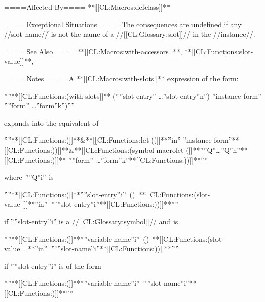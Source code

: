 ====Affected By====
**[[CL:Macros:defclass]]**

====Exceptional Situations====
The consequences are undefined if any //slot-name// is not the name of a //[[CL:Glossary:slot]]// in the //instance//.

====See Also====
**[[CL:Macros:with-accessors]]**, **[[CL:Functions:slot-value]]**, 

====Notes====
A **[[CL:Macros:with-slots]]** expression of the form:

''''\jot\vbox{\settabs\+\cr \+**[[CL:Functions:(with-slots]]** (''{''slot-entry''} \ldots{''slot-entry''}\sub n'') ''instance-form'' ''{''form''} \ldots{''form''}\sub k'')\cr}''''

\noindent expands into the equivalent of

''''\jot\vbox{\settabs\+\cr \+**[[CL:Functions:(]]**&**[[CL:Functions:let ((]]**''in'' ''instance-form''**[[CL:Functions:))]]**\cr \+&**[[CL:Functions:(symbol-macrolet (]]**''{''Q''}\ldots {''Q''}\sub n''**[[CL:Functions:)]]** ''{''form''} \ldots{''form''}\sub k''**[[CL:Functions:))]]**\cr}''''

\noindent where ''{''Q''}\sub i'' is

''''\vbox{\hbox{**[[CL:Functions:(]]**''{''slot-entry''}\sub i'' () **[[CL:Functions:(slot-value ]]**''in'' '''{''slot-entry''}\sub i''**[[CL:Functions:))]]**}}''''

\noindent if ''{''slot-entry''}\sub i'' is a //[[CL:Glossary:symbol]]// and is

''''{\vbox{\hbox{**[[CL:Functions:(]]**''{''variable-name''}\sub i'' () **[[CL:Functions:(slot-value ]]**''in'' '''{''slot-name''}\sub i''**[[CL:Functions:))]]**}}}''''

\noindent if ''{''slot-entry''}\sub i'' is of the form

''''\vbox{\hbox{**[[CL:Functions:(]]**''{''variable-name''}\sub i'' ''{''slot-name''}\sub i''**[[CL:Functions:)]]**}}''''

